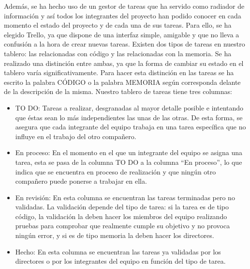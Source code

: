 Además, se ha hecho uso de un gestor de tareas que ha servido como radiador de información y así todos los integrantes del proyecto han podido conocer en cada momento el estado del proyecto y de cada una de sus tareas. Para ello, se ha elegido Trello, ya que dispone de una interfaz simple, amigable y que no lleva a confusión a la hora de crear nuevas tareas.
Existen dos tipos de tareas en nuestro tablero: las relacionadas con código y las relacionadas con la memoria. Se ha realizado una distinción entre ambas, ya que la forma de cambiar su estado en el tablero varía significativamente. Para hacer esta distinción en las tareas se ha escrito la palabra CÓDIGO o la palabra MEMORIA según corresponda delante de la descripción de la misma. Nuestro tablero de tareas tiene tres columnas:
\begin{itemize}
	\item TO DO: Tareas a realizar, desgranadas al mayor detalle posible e intentando que éstas sean lo más independientes las unas de las otras. De esta forma, se asegura que cada integrante del equipo trabaja en una tarea específica que no influye en el trabajo del otro compañero.
	
	\item En proceso: En el momento en el que un integrante del equipo se asigna una tarea, esta se pasa de la columna TO DO a la columna ``En proceso'', lo que indica que se encuentra en proceso de realización y que ningún otro compañero puede ponerse a trabajar en ella. 
	
	\item En revisión: En esta columna se encuentran las tareas terminadas pero no validadas. La validación depende del tipo de tarea: si la tarea es de tipo código, la validación la deben hacer los miembros del equipo realizando pruebas para comprobar que realmente cumple su objetivo y no provoca ningún error, y si es de tipo memoria la deben hacer los directores.
	
	\item Hecho: En esta columna se encuentran las tareas ya validadas por los directores o por los integrantes del equipo en función del tipo de tarea.  
	
\end{itemize}

